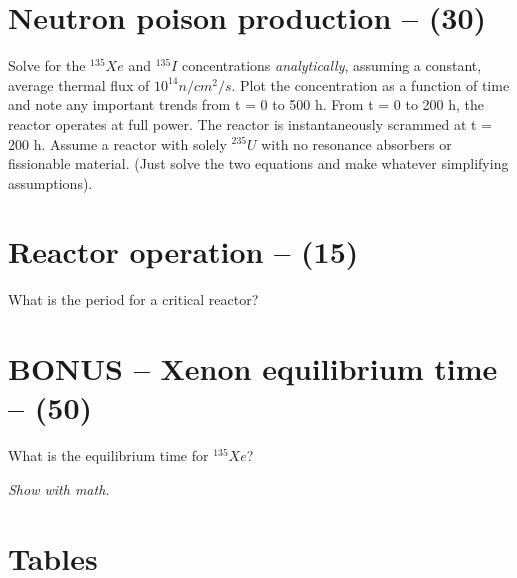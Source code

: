 \documentclass[11pt,a4paper]{article}
\begin{document}
\newpage

\section{Neutron poison production -- (30)}
Solve for the $^{135}Xe$ and $^{135}I$ concentrations \textit{analytically}, assuming a constant, average thermal flux of $10^{14} n/cm^2/s$. Plot the concentration as a function of time and note any important trends from t = 0 to 500 h. From t = 0 to 200 h, the reactor operates at full power. The reactor is instantaneously scrammed at t = 200 h. Assume a reactor with solely $^{235}U$ with no resonance absorbers or fissionable material. (Just solve the two equations and make whatever simplifying assumptions).





\newpage

\section{Reactor operation -- (15)}
What is the period for a critical reactor?





\newpage

\section{BONUS -- Xenon equilibrium time -- (50)}
What is the equilibrium time for $^{135}Xe$? 

\vspace{\baselineskip}

\textit{Show with math.}





\pagestyle{fancyplain}
\fancyhf{} %
\renewcommand{\headrulewidth}{0pt} %
\rfoot{\fancyplain{}{\thepage}}
\nolinenumbers


%
%

\setlength{\bibhang}{0pt}

%


\newpage


\section*{Tables}
\end{document}
